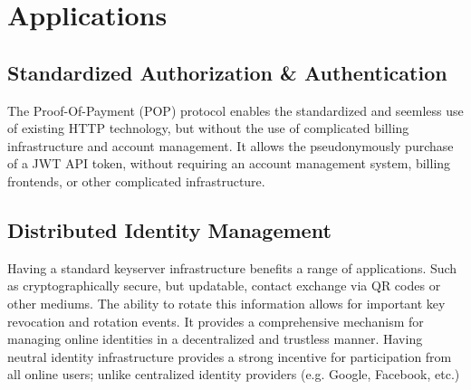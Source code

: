 \documentclass{article}
\begin{document}
\begin{figure}[H]
  \begin{center}
  \end{center}
\end{figure}

\section{Applications}

\subsection{Standardized Authorization \& Authentication}

The Proof-Of-Payment (POP) protocol enables the standardized and seemless use of existing HTTP technology, but without the use of complicated billing infrastructure and account management. It allows the pseudonymously purchase of a JWT API token, without requiring an account management system, billing frontends, or other complicated infrastructure.

\subsection{Distributed Identity Management}

Having a standard keyserver infrastructure benefits a range of applications. Such as cryptographically secure, but updatable, contact exchange via QR codes or other mediums. The ability to rotate this information allows for important key revocation and rotation events. It provides a comprehensive mechanism for managing online identities in a decentralized and trustless manner. Having neutral identity infrastructure provides a strong incentive for participation from all online users; unlike centralized identity providers (e.g. Google, Facebook, etc.)
\end{document}

